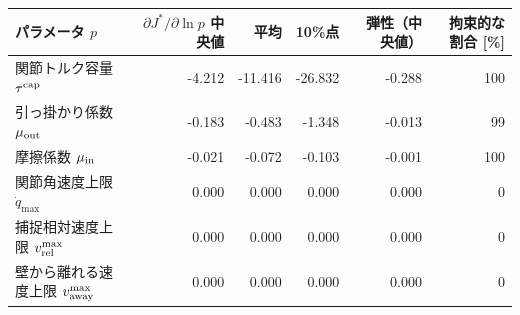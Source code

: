 \begin{tabular}{lrrrrr}
\toprule
パラメータ $p$ & $\partial J^*/\partial\ln p$ 中央値 & 平均 & 10\%点 & 弾性（中央値） & 拘束的な割合 [\%] \\
\midrule
関節トルク容量 $\tau^{\rm cap}$ & -4.212 & -11.416 & -26.832 & -0.288 & 100 \\
引っ掛かり係数 $\mu_{\rm out}$ & -0.183 & -0.483 & -1.348 & -0.013 & 99 \\
摩擦係数 $\mu_{\rm in}$ & -0.021 & -0.072 & -0.103 & -0.001 & 100 \\
関節角速度上限 $\dot q_{\max}$ & 0.000 & 0.000 & 0.000 & 0.000 & 0 \\
捕捉相対速度上限 $v_{\rm rel}^{\max}$ & 0.000 & 0.000 & 0.000 & 0.000 & 0 \\
壁から離れる速度上限 $v_{\rm away}^{\max}$ & 0.000 & 0.000 & 0.000 & 0.000 & 0 \\
\bottomrule
\end{tabular}
